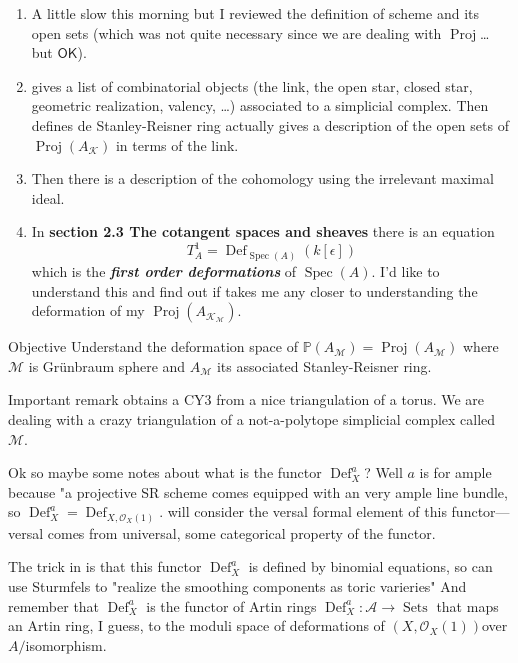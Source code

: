 \begin{enumerate}
\item A little slow this morning but I reviewed the definition of scheme and its open sets (which was not quite necessary since we are dealing with $\operatorname{Proj}$… but $\mathsf{OK}$).
\item \cite{jan2} gives a list of combinatorial objects (the link, the open star, closed star, geometric realization, valency, …) associated to a simplicial complex. Then defines de Stanley-Reisner ring actually gives a description of the open sets of $\operatorname{Proj}(A_{\mathcal{K}})$ in terms of the link.
	\item Then there is a description of the cohomology using the irrelevant maximal ideal.

	\item In \textbf{section 2.3 The cotangent spaces and sheaves} there is an equation
		\[T_A^1=\operatorname{Def}_{\operatorname{Spec}(A)}(k[\epsilon])\]
		which is the \textit{\textbf{first order deformations}} of $\operatorname{Spec}(A)$. {\color{5}I'd like to understand this and find out if takes me any closer to understanding the deformation of my $\operatorname{Proj}(A_{\mathcal{K}_\mathcal{M}})$.}
\end{enumerate}

\begin{thing4}{Objective}\leavevmode
	Understand the deformation space of $\mathbb{P}(A_\mathcal{M})=\operatorname{Proj}(A_\mathcal{M})$ where $\mathcal{M}$ is Grünbraum sphere and $A_\mathcal{M}$ its associated Stanley-Reisner ring.
\end{thing4}

\begin{thing7}{Important remark}\leavevmode
\cite{jan1} obtains a CY3 from a nice triangulation of a torus. We are dealing with a crazy triangulation of a not-a-polytope simplicial complex called $\mathcal{M}$.
\end{thing7}

Ok so maybe some notes about what is the functor $\operatorname{Def}_{X}^a$? Well $a$ is for ample because "a projective SR scheme comes equipped with an very ample line bundle, so $\operatorname{Def}_{X}^a=\operatorname{Def}_{X,\mathcal{O}_X(1)}$.  \cite{jan1} will consider the versal formal element of this functor---versal comes from universal, some categorical property of the functor.

{\color{4}The trick in \cite{jan1} is that this functor $\operatorname{Def}_{X}^a$ is defined by binomial equations, so \cite{jan1} can use Sturmfels to "{\color{2}realize the smoothing components as toric varieries"}} And remember that $\operatorname{Def}^a_{X}$ is the functor of Artin rings $\operatorname{Def}^a_{X}:\mathcal{A}\longrightarrow \operatorname{Sets}$ that maps an Artin ring, I guess, to the moduli space of deformations of $(X,\mathcal{O}_X(1))$over $A \Big/$isomorphism.

